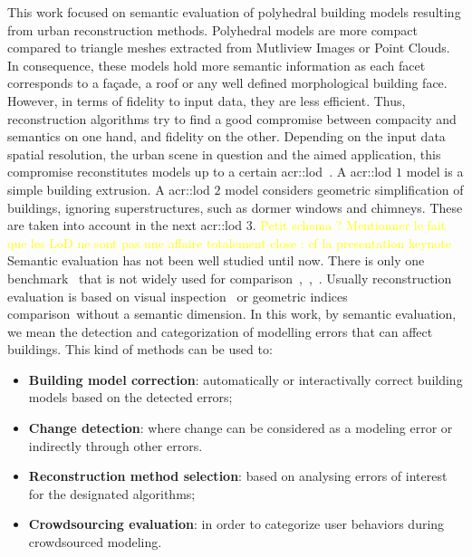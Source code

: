 \documentclass[runningheads]{llncs}
\begin{document}
	This work focused on semantic evaluation of polyhedral building models resulting from urban reconstruction methods. Polyhedral models are more compact compared to triangle meshes extracted from Mutliview Images or Point Clouds. In consequence, these models hold more semantic information as each facet corresponds to a fa\c{c}ade, a roof or any well defined morphological building face. However, in terms of fidelity to input data, they are less efficient. Thus, reconstruction algorithms try to find a good compromise between compacity and semantics on one hand, and fidelity on the other. Depending on the input data spatial resolution, the urban scene in question and the aimed application, this compromise reconstitutes models up to a certain \acrfull{acr::lod}~\cite{kolbe2005citygml}. A \acrshort{acr::lod} $1$ model is a simple building extrusion. A \acrshort{acr::lod} $2$ model considers geometric simplification of buildings, ignoring superstructures, such as dormer windows and chimneys. These are taken into account in the next \acrshort{acr::lod} $3$. \textcolor{yellow}{Petit schema ? Mentionner le fait que les LoD ne sont pas une affaire totalement close : cf la presentation keynote}\\
	
	Semantic evaluation has not been well studied until now. There is only one benchmark~\cite{rottensteiner2014results} that is not widely used for comparison~\cite{Lafarge2012},~\cite{nguatem2017modeling},~\cite{li2016boxfitting}. Usually reconstruction evaluation is based on visual inspection~\cite{Musialski2012} or geometric indices comparison\ without a semantic dimension. In this work, by semantic evaluation, we mean the detection and categorization of modelling errors that can affect buildings. This kind of methods can be used to:
	\begin{itemize}
		\item \textbf{Building model correction}: automatically or interactivally correct building models based on the detected errors;
		\item \textbf{Change detection}: where change can be considered as a modeling error or indirectly through other errors.
		\item \textbf{Reconstruction method selection}: based on analysing errors of interest for the designated algorithms;
		\item \textbf{Crowdsourcing evaluation}: in order to categorize user behaviors during crowdsourced modeling.
	\end{itemize}
	
\end{document}
